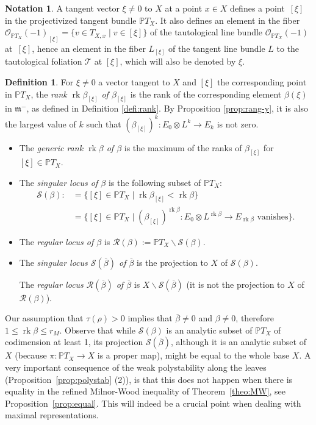 \documentclass[JEP,XML,SOM,Unicode,NoFloatCountersInSection]{cedram}
\let\mathcal\mathscr
\theoremstyle{plain}
\theoremstyle{definition}
\newtheorem{defi}[theo]{Definition}
\newtheorem{nota}[theo]{Notation}
\let\ov\overline
\DeclareMathOperator{\rk}{rk}
\newcommand{\cR}{\mathcal{R}}
\newcommand{\cS}{\mathcal{S}}
\newcommand{\cT}{\mathcal{T}}
\newcommand{\PTX}{{\mathbb{P}T_X}}
\newcommand{\OX}{\mathcal{O}_{\PTX}(-1)}
\newcommand{\fm}{\mathfrak{m}}
\newcommand{\rkm}{{r_M}}
\newcommand{\ovb}{\ov{\beta}}
\begin{document}
\begin{nota}
A tangent vector $\xi\neq 0$ to $X$ at a point $x\in X$ defines a point~$[\xi]$ in the
projectivized tangent bundle $\PTX$. It also defines an element
in the fiber ${\OX}_{[\xi]}=\{v\in T_{X,x}\mid v\in[\xi]\}$ of the tautological line bundle $\OX$
at~$[\xi]$, hence an element in the fiber $L_{[\xi]}$ of the tangent line bundle $L$ to the
tautological foliation $\cT$ at
$[\xi]$, which will also be denoted by $\xi$.
\end{nota}

\begin{defi}
\label{defi:rg-beta}
For $\xi\neq 0$ a vector tangent to $X$ and $[\xi]$ the corresponding point in $\PTX$,
the \emph{rank $\rk\beta_{[\xi]}$ of $\beta_{[\xi]}$} is the rank of the
corresponding element $\beta(\xi)$
in $\fm^-$, as defined in Definition \ref{defi:rank}.
By Proposition \ref{prop:rang-y}, it is also the largest value of $k$
such that $(\beta_{[\xi]})^k:E_0\otimes L^{k}\to E_{k}$ is not zero.

\begin{itemize}
\item
The \emph{generic rank $\rk\beta$
of $\beta$} is the maximum of the ranks of $\beta_{[\xi]}$ for $[\xi]\in\PTX$.

\item
The \emph{singular locus of $\beta$} is the following subset of $\PTX$:
\begin{align*}
\cS(\beta): &=\{[\xi]\in\PTX\mid
\rk\beta_{[\xi]}<\rk\beta\}\\
&=\{[\xi]\in\PTX\mid (\beta_{[\xi]})^{\rk\beta}: E_0\otimes L^{\rk\beta}\rightarrow E_{\rk\beta}\mbox{ vanishes}\}.
\end{align*}

\item
The \emph{regular locus of $\beta$} is $\cR(\beta):=\PTX\backslash\cS(\beta)$.

\item
The \emph{singular locus $\cS(\ovb)$ of $\ovb$} is the projection to $X$ of $\cS(\beta)$.

The \emph{regular locus $\cR(\ovb)$ of $\ovb$} is $X\backslash\cS(\ovb)$ (it is not the
projection to $X$ of ${\cR}(\beta)$).

\end{itemize}
\end{defi}

Our assumption that $\tau(\rho)\!>\!0$ implies that $\ovb\!\neq\!0$ and $\beta\!\neq\!0$, therefore
\hbox{$1\leq \rk\beta\leq\rkm$}.
Observe that while $\cS(\beta)$
is an analytic subset of $\PTX$ of codimension at least 1,
its projection $\cS(\ovb)$, although
it is an analytic subset of $X$ (because
$\pi:\PTX\to X$ is a proper map), might be equal to the whole base $X$. A very important
consequence of the
weak polystability along the
leaves (Proposition~\ref{prop:polystab} (2)), is that this does not happen when there is equality
in the refined Milnor-Wood inequality of Theorem~\ref{theo:MW}, see
Proposition~\ref{prop:equal}. This will indeed be a crucial point when dealing with maximal
representations.
\end{document}
